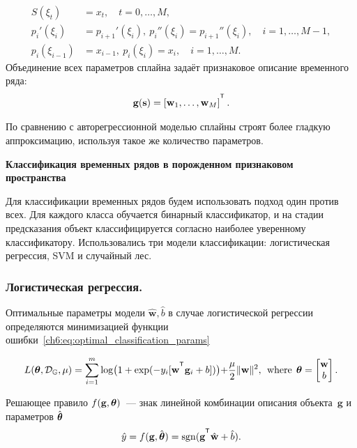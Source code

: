 \documentclass[11pt, a5paper]{dissert}
\begin{document}
\begin{align*}
	S(\xi_t) &= x_t, \quad t = 0, \dots, M,\\
	p_i'(\xi_i) &= p_{i+1}'(\xi_i),\: p_i''(\xi_i) = p_{i+1}''(\xi_i), \quad i = 1, \dots, M-1,\\
	p_i(\xi_{i-1}) &= x_{i-1},\: p_i(\xi_i) = x_i, \quad i = 1, \dots, M.
\end{align*}
Объединение всех параметров сплайна задаёт признаковое описание временного ряда:
\[
	\mathbf{g}(\bs) = \left[\mathbf{w}_1, \dots, \mathbf{w}_{M}\right]^{\T}.
\]

По сравнению с авторегрессионной моделью сплайны строят более гладкую аппроксимацию, используя такое же количество параметров.

\textbf{Классификация временных рядов в порожденном признаковом пространства}
\label{sec:ch6:feature_generation_classification}

Для классификации временных рядов будем использовать подход один против всех. 
Для каждого класса обучается бинарный классификатор, и на стадии предсказания объект классифицируется согласно наиболее уверенному классификатору.
Использовались три модели классификации: логистическая регрессия, SVM и случайный лес.

\subsubsection{Логистическая регрессия.}
Оптимальные параметры модели $\hat{\mathbf{w}}, \hat{b}$  в случае логистической регрессии определяются минимизацией функции ошибки~\eqref{ch6:eq:optimal_classification_params}

\begin{equation*}
	L(\btheta, \mathcal{D}_\mathbb{G}, \mu) = \sum_{i=1}^{m} \log\bigl(1 + \exp(-y_i [\mathbf{w}^{\T} \mathbf{g}_i + b])\bigl) + \frac{\mu}{2} \|\mathbf{w}\|^2, \:\:\mbox{where}\:\: \btheta  = \begin{bmatrix}
	\mathbf{w} \\ b
	\end{bmatrix}.
\end{equation*}

Решающее правило $f(\mathbf{g}, \boldsymbol{\theta})$~--- знак линейной комбинации описания объекта~$\mathbf{g}$ и параметров $\hat{\boldsymbol{\theta}}$
\begin{equation*}
	\hat{y} = f(\mathbf{g}, \hat{\btheta}) = \sgn(\mathbf{g}^{\T} \hat{\mathbf{w}} + \hat{b}).
\end{equation*}
\end{document}
